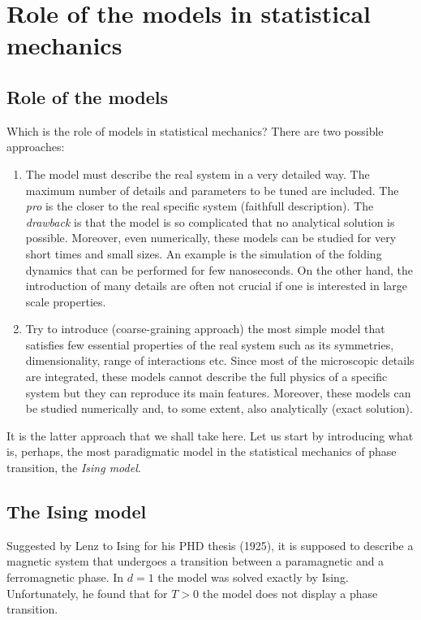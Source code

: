 \documentclass[../main/main.tex]{subfiles}
\begin{document}
\chapter{Role of the models in statistical mechanics}
\section{Role of the models}
Which is the role of models in statistical mechanics? There are two possible approaches:
\begin{enumerate}
  \item The model must describe the real system in a very detailed way. The maximum number of details and parameters to be tuned are included. The \emph{pro} is the closer to the real specific system (faithfull description). The \emph{drawback} is that the model is so complicated that no analytical solution is possible. Moreover, even numerically, these models can be studied for very short times and small sizes.
  An example is the simulation of the folding dynamics that can be performed for few nanoseconds. On the other hand, the introduction of many details are often not crucial if one is interested in large scale properties.
  \item Try to introduce (coarse-graining approach) the most simple model that satisfies few essential properties of the real system such as its symmetries, dimensionality, range of interactions etc.
  Since most of the microscopic details are integrated, these models cannot describe the full physics of a specific system but they can reproduce its main features. Moreover, these models can be studied numerically and, to some extent, also analytically (exact solution).
\end{enumerate}

It is the latter approach that we shall take here.
  Let us start by introducing what is, perhaps, the most paradigmatic model in the statistical mechanics of phase transition, the \emph{Ising model}.

  \section{The Ising model}
  Suggested by Lenz to Ising for his PHD thesis (1925), it is supposed to describe a magnetic system that undergoes a transition between a paramagnetic and a ferromagnetic phase.
  In \( d=1 \) the model was solved exactly by Ising. Unfortunately, he found that for \( T>0 \) the model does not display a phase transition.
\end{document}
